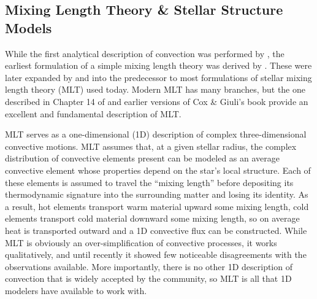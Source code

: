 \subsection{Mixing Length Theory \& Stellar Structure Models}
While the first analytical description of convection was performed by \citet{rayleigh1916}, the earliest formulation of a simple mixing length theory was derived by \citet{prandtl1925}.
These were later expanded by \citet{vitense1953} and \citet{bohm-vitense1958} into the predecessor to most formulations of stellar mixing length theory (MLT) used today.
Modern MLT has many branches, but the one described in Chapter 14 of \citet{weiss&all2004} and earlier versions of Cox \& Giuli's book provide an excellent and fundamental description of MLT.

MLT serves as a one-dimensional (1D) description of complex three-dimensional convective motions.
MLT assumes that, at a given stellar radius, the complex distribution of convective elements present can be modeled as an average convective element whose properties depend on the star's local structure.
Each of these elements is assumed to travel the ``mixing length'' before depositing its thermodynamic signature into the surrounding matter and losing its identity.
As a result, hot elements transport warm material upward some mixing length, cold elements transport cold material downward some mixing length, so on average heat is transported outward and a 1D convective flux can be constructed.
While MLT is obviously an over-simplification of convective processes, it works qualitatively, and until recently it showed few noticeable disagreements with the observations available.
More importantly, there is no other 1D description of convection that is widely accepted by the community, so MLT is all that 1D modelers have available to work with.

